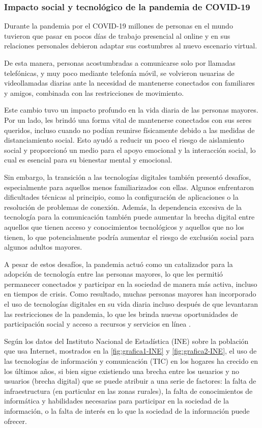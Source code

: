 \subsubsection{Impacto social y tecnológico de la pandemia de COVID-19}

Durante la pandemia por el COVID-19 millones de personas en el mundo tuvieron que pasar en pocos días de trabajo presencial al online y en sus relaciones personales debieron adaptar sus costumbres al nuevo escenario virtual.

De esta manera, personas acostumbradas a comunicarse solo por llamadas telefónicas, y muy poco mediante telefonía móvil, se volvieron usuarias de videollamadas diarias ante la necesidad de mantenerse conectados con familiares y amigos, combinada con las restricciones de movimiento.

Este cambio tuvo un impacto profundo en la vida diaria de las personas mayores. Por un lado, les brindó una forma vital de mantenerse conectados con sus seres queridos, incluso cuando no podían reunirse físicamente debido a las medidas de distanciamiento social. Esto ayudó a reducir un poco el riesgo de aislamiento social y proporcionó un medio para el apoyo emocional y la interacción social, lo cual es esencial para su bienestar mental y emocional.

Sin embargo, la transición a las tecnologías digitales también presentó desafíos, especialmente para aquellos menos familiarizados con ellas. Algunos enfrentaron dificultades técnicas al principio, como la configuración de aplicaciones o la resolución de problemas de conexión. Además, la dependencia excesiva de la tecnología para la comunicación también puede aumentar la brecha digital entre aquellos que tienen acceso y conocimientos tecnológicos y aquellos que no los tienen, lo que potencialmente podría aumentar el riesgo de exclusión social para algunos adultos mayores.

A pesar de estos desafíos, la pandemia actuó como un catalizador para la adopción de tecnología entre las personas mayores, lo que les permitió permanecer conectados y participar en la sociedad de manera más activa, incluso en tiempos de crisis. Como resultado, muchas personas mayores han incorporado el uso de tecnologías digitales en su vida diaria incluso después de que levantaran las restricciones de la pandemia, lo que les brinda nuevas oportunidades de participación social y acceso a recursos y servicios en línea \parencite{intro2}.

Según los datos del Instituto Nacional de Estadística (INE) sobre la población que usa Internet, mostrados en la \autoref{fig:grafica1-INE} y \ref{fig:grafica2-INE}, el uso de las tecnologías de información y comunicación (TIC) en los hogares ha crecido en los últimos años, si bien sigue existiendo una brecha entre los usuarios y no usuarios (brecha digital) que se puede atribuir a una serie de factores: la falta de infraestructura (en particular en las zonas rurales), la falta de conocimientos de informática y habilidades necesarias para participar en la sociedad de la información, o la falta de interés en lo que la sociedad de la información puede ofrecer.

